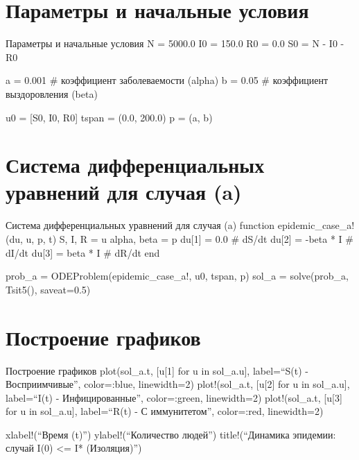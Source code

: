 \documentclass[
  ignorenonframetext,
  aspectratio=169,
  russian,
]{beamer}
\begin{document}
\section{Параметры и начальные
условия}\label{ux43fux430ux440ux430ux43cux435ux442ux440ux44b-ux438-ux43dux430ux447ux430ux43bux44cux43dux44bux435-ux443ux441ux43bux43eux432ux438ux44f}

\begin{frame}{Параметры и начальные условия}
N = 5000.0 I0 = 150.0 R0 = 0.0 S0 = N - I0 - R0

a = 0.001 \# коэффициент заболеваемости (alpha) b = 0.05 \# коэффициент
выздоровления (beta)

u0 = {[}S0, I0, R0{]} tspan = (0.0, 200.0) p = (a, b)
\end{frame}

\section{Система дифференциальных уравнений для случая
(a)}\label{ux441ux438ux441ux442ux435ux43cux430-ux434ux438ux444ux444ux435ux440ux435ux43dux446ux438ux430ux43bux44cux43dux44bux445-ux443ux440ux430ux432ux43dux435ux43dux438ux439-ux434ux43bux44f-ux441ux43bux443ux447ux430ux44f-a}

\begin{frame}{Система дифференциальных уравнений для случая (a)}
function epidemic\_case\_a!(du, u, p, t) S, I, R = u alpha, beta = p
du{[}1{]} = 0.0 \# dS/dt du{[}2{]} = -beta * I \# dI/dt du{[}3{]} = beta
* I \# dR/dt end

prob\_a = ODEProblem(epidemic\_case\_a!, u0, tspan, p) sol\_a =
solve(prob\_a, Tsit5(), saveat=0.5)
\end{frame}

\section{Построение
графиков}\label{ux43fux43eux441ux442ux440ux43eux435ux43dux438ux435-ux433ux440ux430ux444ux438ux43aux43eux432}

\begin{frame}{Построение графиков}
plot(sol\_a.t, {[}u{[}1{]} for u in sol\_a.u{]}, label=\enquote{S(t) -
Восприимчивые}, color=:blue, linewidth=2) plot!(sol\_a.t, {[}u{[}2{]}
for u in sol\_a.u{]}, label=\enquote{I(t) - Инфицированные},
color=:green, linewidth=2) plot!(sol\_a.t, {[}u{[}3{]} for u in
sol\_a.u{]}, label=\enquote{R(t) - С иммунитетом}, color=:red,
linewidth=2)

xlabel!(\enquote{Время (t)}) ylabel!(\enquote{Количество людей})
title!(\enquote{Динамика эпидемии: случай I(0) \textless= I*
(Изоляция)})
\end{frame}
\end{document}
